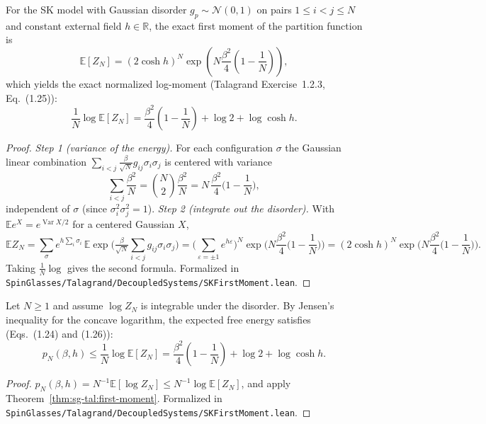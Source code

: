 \begin{theorem}\label{thm:sg-tal:first-moment}
  \leanok
{}
For the SK model with Gaussian disorder $g_p \sim \mathcal{N}(0, 1)$ on pairs $1 \le i < j \le N$ and constant external field $h \in \mathbb{R}$,
the exact first moment of the partition function is
\[
\mathbb{E}[Z_N] = (2\cosh h)^N \exp\left(N \frac{\beta^2}{4}\left(1 - \frac{1}{N}\right)\right),
\]
which yields the exact normalized log-moment (Talagrand Exercise~1.2.3, Eq.~(1.25)):
\[
\frac{1}{N} \log \mathbb{E}[Z_N] = \frac{\beta^2}{4}\left(1 - \frac{1}{N}\right) + \log 2 + \log\cosh h.
\]
\end{theorem}
\begin{proof}
  \leanok
\emph{Step 1 (variance of the energy).} For each configuration $\sigma$ the Gaussian linear combination $\sum_{i<j}\frac\beta{\sqrt N}g_{ij}\sigma_i\sigma_j$ is centered with variance
\[
\sum_{i<j}\frac{\beta^2}N=\binom N2\frac{\beta^2}N=N\,\frac{\beta^2}4\Big(1-\frac1N\Big),
\]
independent of $\sigma$ (since $\sigma_i^2\sigma_j^2=1$).
\emph{Step 2 (integrate out the disorder).} With $\mathbb Ee^{X}=e^{\operatorname{Var}X/2}$ for a centered Gaussian $X$,
\[
\mathbb EZ_N=\sum_\sigma e^{h\sum_i\sigma_i}\,\mathbb E\exp\Big(\tfrac\beta{\sqrt N}\sum_{i<j}g_{ij}\sigma_i\sigma_j\Big)=\Big(\sum_{\varepsilon=\pm1}e^{h\varepsilon}\Big)^N\exp\Big(N\frac{\beta^2}4\Big(1-\frac1N\Big)\Big)=(2\cosh h)^N\exp\Big(N\frac{\beta^2}4\Big(1-\frac1N\Big)\Big).
\]
Taking $\frac1N\log$ gives the second formula.
Formalized in \texttt{SpinGlasses/Talagrand/DecoupledSystems/SKFirstMoment.lean}.
\end{proof}

\begin{theorem}\label{thm:sg-tal:first-moment-bound}
  \leanok
{}
Let $N\ge1$ and assume $\log Z_N$ is integrable under the disorder. By Jensen's inequality for the concave logarithm, the expected free energy satisfies (Eqs.~(1.24) and (1.26)):
\[
p_N(\beta, h) \le \frac{1}{N} \log \mathbb{E}[Z_N] = \frac{\beta^2}{4}\left(1 - \frac{1}{N}\right) + \log 2 + \log\cosh h.
\]
\end{theorem}
\begin{proof}
  \leanok
$p_N(\beta, h) = N^{-1}\mathbb{E}[\log Z_N] \le N^{-1}\log \mathbb{E}[Z_N]$, and apply Theorem~\ref{thm:sg-tal:first-moment}.
Formalized in \texttt{SpinGlasses/Talagrand/DecoupledSystems/SKFirstMoment.lean}.
\end{proof}

